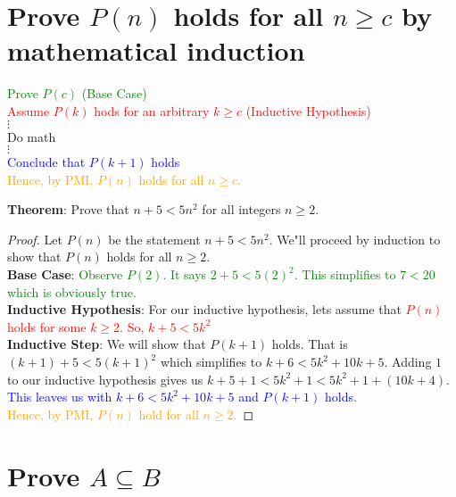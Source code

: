 \documentclass[11pt, oneside]{article}
\begin{document}
	   
\section{Prove $P(n)$ holds for all $n \ge c$ by mathematical induction}

 	           \begin{center}
  	          \textcolor{green}{Prove $P(c)$ (Base Case)}\\
 	         \textcolor{red}{Assume $P(k)$ hods for an arbitrary $k \ge c$ (Inductive Hypothesis)}\\
 	         $\vdots$ \\ Do math   \\ $\vdots$ \\   
	         \textcolor{blue}{Conclude that  $P(k+1)$ holds } \\
  	        \textcolor{orange}{Hence, by PMI, $P(n)$ holds for all $n \ge c$.}\\[0.2in]
	         \end{center}
   
 \noindent \textbf{Theorem}:  Prove that $n+5 < 5n^{2}$ for all integers $n\geq 2$.
 \begin{proof}
 Let $P(n)$ be the statement $n+5 < 5n^{2}$. We"ll proceed by induction to show that $P(n)$ holds for all $n\geq 2$. \\
 \textbf{Base Case}:
 \textcolor{green}{Observe $P(2)$. It says $2+5 < 5(2)^{2}$. This simplifies to $7 < 20$ which is obviously true.} \\
 \textbf{Inductive Hypothesis}:
 For our inductive hypothesis, lets assume that
 \textcolor{red}{$P(n)$ holds for some $k \geq 2$. So, $k+5 < 5k^{2}$}\\
 \textbf{Inductive Step}:
 We will show that $P(k+1)$ holds. That is $(k+1)+5 < 5(k+1)^{2}$ which simplifies to $k+6 < 5k^{2}+10k+5$. Adding $1$ to our inductive hypothesis gives us $k+5+1 < 5k^{2}+1 < 5k^{2}+1+(10k+4)$.
 \textcolor{blue}{This leaves us with $k+6 < 5k^{2}+10k+5$ and $P(k+1)$ holds.}\\
 \textcolor{orange}{Hence, by PMI, $P(n)$ hold for all $n\geq 2$.}
 \end{proof}
 
 
 
		 \newpage

\section{Prove $A \subseteq B$}
\end{document}
